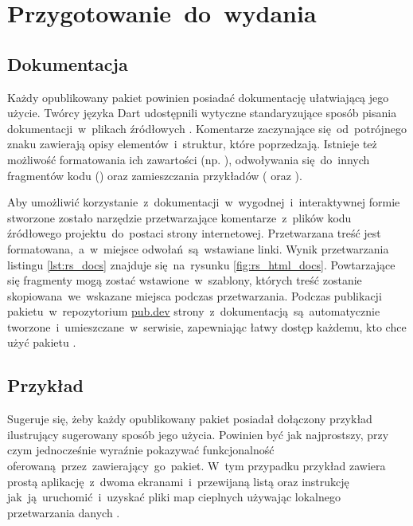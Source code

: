 \section{Przygotowanie~do~wydania}

\subsection{Dokumentacja}
Każdy opublikowany pakiet powinien posiadać dokumentację ułatwiającą jego użycie. Twórcy języka Dart udostępnili wytyczne standaryzujące sposób pisania dokumentacji~w~plikach źródłowych \cite{Dart_Doc_Guidelines}. Komentarze zaczynające się~od~potrójnego znaku \codeinline{///} zawierają opisy elementów~i~struktur, które poprzedzają. Istnieje też możliwość formatowania ich zawartości (np. ), odwoływania się~do~innych fragmentów kodu () oraz zamieszczania przykładów ( oraz ).

\bigskip


Aby umożliwić korzystanie~z~dokumentacji~w~wygodnej~i~interaktywnej formie stworzone zostało narzędzie  \cite{Dart_Doc} przetwarzające komentarze~z~plików kodu źródłowego projektu~do~postaci strony internetowej. Przetwarzana treść jest formatowana,~a~w~miejsce odwołań~są~wstawiane linki. Wynik przetwarzania listingu \ref{lst:rs_docs} znajduje się~na~rysunku \ref{fig:rs_html_docs}. Powtarzające się fragmenty mogą zostać wstawione~w~szablony, których treść zostanie skopiowana~we~wskazane miejsca podczas przetwarzania. Podczas publikacji pakietu~w~repozytorium \href{https://pub.dev/}{pub.dev} strony~z~dokumentacją~są~automatycznie tworzone~i~umieszczane~w~serwisie, zapewniając łatwy dostęp każdemu, kto chce użyć pakietu \cite{RS_Documentation}.

\bigskip
{}

\subsection{Przykład}
\label{sec:rs_example}
Sugeruje się, żeby każdy opublikowany pakiet posiadał dołączony przykład ilustrujący sugerowany sposób jego użycia. Powinien być jak najprostszy, przy czym jednocześnie wyraźnie pokazywać funkcjonalność oferowaną~przez~zawierający~go~pakiet. W~tym przypadku przykład zawiera prostą aplikację~z~dwoma ekranami~i~przewijaną listą oraz instrukcję jak~ją~uruchomić~i~uzyskać pliki map cieplnych używając lokalnego przetwarzania danych \cite{RS_Example}.

